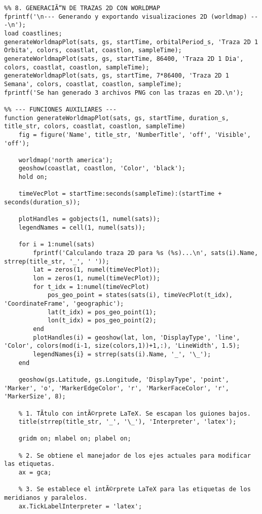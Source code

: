 \begin{verbatim}
%% 8. GENERACIÃ“N DE TRAZAS 2D CON WORLDMAP
fprintf('\n--- Generando y exportando visualizaciones 2D (worldmap) ---\n');
load coastlines;
generateWorldmapPlot(sats, gs, startTime, orbitalPeriod_s, 'Traza 2D 1 Orbita', colors, coastlat, coastlon, sampleTime);
generateWorldmapPlot(sats, gs, startTime, 86400, 'Traza 2D 1 Dia', colors, coastlat, coastlon, sampleTime);
generateWorldmapPlot(sats, gs, startTime, 7*86400, 'Traza 2D 1 Semana', colors, coastlat, coastlon, sampleTime);
fprintf('Se han generado 3 archivos PNG con las trazas en 2D.\n');

%% --- FUNCIONES AUXILIARES ---
function generateWorldmapPlot(sats, gs, startTime, duration_s, title_str, colors, coastlat, coastlon, sampleTime)
    fig = figure('Name', title_str, 'NumberTitle', 'off', 'Visible', 'off');
    
    worldmap('north america'); 
    geoshow(coastlat, coastlon, 'Color', 'black');
    hold on;
    
    timeVecPlot = startTime:seconds(sampleTime):(startTime + seconds(duration_s));
    
    plotHandles = gobjects(1, numel(sats));
    legendNames = cell(1, numel(sats));

    for i = 1:numel(sats)
        fprintf('Calculando traza 2D para %s (%s)...\n', sats(i).Name, strrep(title_str, '_', ' '));
        lat = zeros(1, numel(timeVecPlot));
        lon = zeros(1, numel(timeVecPlot));
        for t_idx = 1:numel(timeVecPlot)
            pos_geo_point = states(sats(i), timeVecPlot(t_idx), 'CoordinateFrame', 'geographic');
            lat(t_idx) = pos_geo_point(1);
            lon(t_idx) = pos_geo_point(2);
        end
        plotHandles(i) = geoshow(lat, lon, 'DisplayType', 'line', 'Color', colors(mod(i-1, size(colors,1))+1,:), 'LineWidth', 1.5);
        legendNames{i} = strrep(sats(i).Name, '_', '\_');
    end
    
    geoshow(gs.Latitude, gs.Longitude, 'DisplayType', 'point', 'Marker', 'o', 'MarkerEdgeColor', 'r', 'MarkerFaceColor', 'r', 'MarkerSize', 8);
    
    % 1. TÃ­tulo con intÃ©rprete LaTeX. Se escapan los guiones bajos.
    title(strrep(title_str, '_', '\_'), 'Interpreter', 'latex');
    
    gridm on; mlabel on; plabel on;
    
    % 2. Se obtiene el manejador de los ejes actuales para modificar las etiquetas.
    ax = gca;
    
    % 3. Se establece el intÃ©rprete LaTeX para las etiquetas de los meridianos y paralelos.
    ax.TickLabelInterpreter = 'latex';
    

\end{verbatim}
